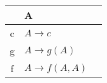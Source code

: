 \documentclass{article}
\begin{document}
\begin{tabularx}{15cm}{|c|p{4cm}|X|}
    \hline
     & A & \\
    \hline
    c & $A \rightarrow c$ & \\
    \hline
    g & $A \rightarrow g(A)$ & \\
    \hline
    f & $A \rightarrow f(A,A)$ & \\
    \hline
\end{tabularx}
\end{document}
